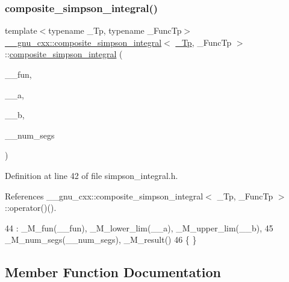 \subsubsection{\texorpdfstring{composite\+\_\+simpson\+\_\+integral()}{composite\_simpson\_integral()}}
{\footnotesize\ttfamily template$<$typename \+\_\+\+Tp, typename \+\_\+\+Func\+Tp$>$ \\
\hyperlink{class____gnu__cxx_1_1composite__simpson__integral}{\+\_\+\+\_\+gnu\+\_\+cxx\+::composite\+\_\+simpson\+\_\+integral}$<$ \hyperlink{namespace____gnu__cxx_a3b19a9c800ca194374ef9172290f7d79}{\+\_\+\+Tp}, \+\_\+\+Func\+Tp $>$\+::\hyperlink{class____gnu__cxx_1_1composite__simpson__integral}{composite\+\_\+simpson\+\_\+integral} (\begin{DoxyParamCaption}\item[{\+\_\+\+Func\+Tp}]{\+\_\+\+\_\+fun,  }\item[{\hyperlink{namespace____gnu__cxx_a3b19a9c800ca194374ef9172290f7d79}{\+\_\+\+Tp}}]{\+\_\+\+\_\+a,  }\item[{\hyperlink{namespace____gnu__cxx_a3b19a9c800ca194374ef9172290f7d79}{\+\_\+\+Tp}}]{\+\_\+\+\_\+b,  }\item[{std\+::size\+\_\+t}]{\+\_\+\+\_\+num\+\_\+segs }\end{DoxyParamCaption})\hspace{0.3cm}{\ttfamily [inline]}}



Definition at line 42 of file simpson\+\_\+integral.\+h.



References \+\_\+\+\_\+gnu\+\_\+cxx\+::composite\+\_\+simpson\+\_\+integral$<$ \+\_\+\+Tp, \+\_\+\+Func\+Tp $>$\+::operator()().


\begin{DoxyCode}
44       : \_M\_fun(\_\_fun), \_M\_lower\_lim(\_\_a), \_M\_upper\_lim(\_\_b),
45         \_M\_num\_segs(\_\_num\_segs), \_M\_result()
46       \{ \}
\end{DoxyCode}


\subsection{Member Function Documentation}
\mbox{\label{class____gnu__cxx_1_1composite__simpson__integral_a932c3e6ea25f340113955340dbec54c0}} 
